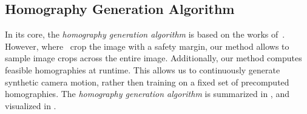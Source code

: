\subsection{Homography Generation Algorithm}
\label{c3:sec:hom_gen}

In its core, the \textit{homography generation algorithm} is based on the works of~\cite{detone2016deep}. However, where~\cite{detone2016deep} crop the image with a safety margin, our method allows to sample image crops across the entire image. Additionally, our method computes feasible homographies at runtime. This allows us to continuously generate synthetic camera motion, rather then training on a fixed set of precomputed homographies. The \textit{homography generation algorithm} is summarized in , and visualized in .

